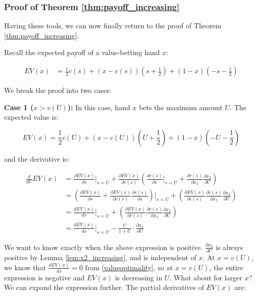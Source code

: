 \documentclass[../../main/main.tex]{subfiles}
\begin{document}
\subsubsection{Proof of Theorem \ref{thm:payoff_increasing}}

Having these tools, we can now finally return to the proof of Theorem \ref{thm:payoff_increasing}.

\begin{customproof}
    Recall the expected payoff of a value-betting hand $x$:

    \begin{align*}
        EV(x) & = \frac{1}{2} c(s) + (x - c(s)) \left(s+\frac{1}{2}\right) + (1-x) \left(-s-\frac{1}{2}\right)
    \end{align*}

    We break the proof into two cases:

    \textbf{Case 1 ($x > v(U)$):} In this case, hand $x$ bets the maximum amount $U$. The expected value is:
    
    $$ EV(x) = \frac{1}{2} c(U) + (x - c(U)) \left(U+\frac{1}{2}\right) + (1-x) \left(-U-\frac{1}{2}\right) $$ 

    and the derivative is:

    \begin{align*}
        \frac{d}{dU} EV(x) & = \frac{\partial EV(x)}{\partial s} \bigg|_{s=U} + \frac{\partial EV(x)}{\partial c(s)} \left( \frac{\partial c(s)}{\partial s}\bigg|_{s=U} + \frac{\partial c(s)}{\partial x_2} \frac{\partial x_2}{\partial U} \right) \\
        & = \left( \frac{\partial EV(x)}{\partial s} + \frac{\partial EV(x)}{\partial c(s)} \frac{\partial c(s)}{\partial s}\right)\bigg|_{s=U}   +  \left( \frac{\partial EV(x)}{\partial c(s)} \frac{\partial c(s)}{\partial x_2} \frac{\partial x_2}{\partial U} \right) \\
        & = \frac{dEV(x)}{ds}\bigg|_{s=U}   +  \left( \frac{\partial EV(x)}{\partial c(s)} \frac{\partial c(s)}{\partial x_2} \frac{\partial x_2}{\partial U} \right) \\
        & = \frac{dEV(x)}{ds}\bigg|_{s=U}  - \frac{U}{1+U} \cdot \frac{\partial x_2} {\partial U}
    \end{align*} 

    We want to know exactly when the above expression is positive. $\frac{\partial x_2}{\partial U}$ is always positive by Lemma \ref{lem:x2_increasing}, and is independent of $x$. At $x = v(U)$, we know that $\frac{dEV(x)}{ds} = 0$ from \ref{valueoptimality}, so at $x = v(U)$, the entire expression is negative and $EV(x)$ is decreasing in $U$. What about for larger $x$? We can expand the expression further. The partial derivatives of $EV(x)$ are:


\end{customproof}
\end{document}

